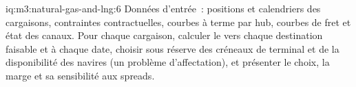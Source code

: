 \begin{solution}{iq:m3:natural-gas-and-lng:6}
Données d'entrée~: positions et calendriers des cargaisons, contraintes contractuelles, courbes à terme par hub,
courbes de fret et état des canaux. Pour chaque cargaison, calculer le  vers chaque destination
faisable et à chaque date, choisir sous réserve des créneaux de terminal et de la disponibilité des navires (un
problème d'affectation), et présenter le choix, la marge et sa sensibilité aux spreads.
\end{solution}
